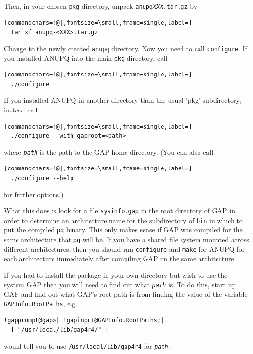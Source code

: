 \documentclass[a4paper,11pt]{report}
\begin{document}
{ Then, in your chosen \texttt{pkg} directory, unpack \texttt{anupq\texttt{}\mbox{\texttt{\mdseries\slshape XXX}}.tar.gz} by 
\begin{Verbatim}[commandchars=!@|,fontsize=\small,frame=single,label=]
  tar xf anupq-<XXX>.tar.gz
\end{Verbatim}
 Change to the newly created \texttt{anupq} directory. Now you need to call \texttt{configure}. If you installed \textsf{ANUPQ} into the main \texttt{pkg} directory, call 
\begin{Verbatim}[commandchars=!@|,fontsize=\small,frame=single,label=]
  ./configure
\end{Verbatim}
 If you installed ANUPQ in another directory than the usual 'pkg' subdirectory,
instead call 
\begin{Verbatim}[commandchars=!@|,fontsize=\small,frame=single,label=]
  ./configure --with-gaproot=<path>
\end{Verbatim}
 where \mbox{\texttt{\mdseries\slshape path}} is the path to the \textsf{GAP} home directory. (You can also call 
\begin{Verbatim}[commandchars=!@|,fontsize=\small,frame=single,label=]
  ./configure --help
\end{Verbatim}
 for further options.) 

 What this does is look for a file \texttt{sysinfo.gap} in the root directory of \textsf{GAP} in order to determine an architecture name for the subdirectory of \texttt{bin} in which to put the compiled \texttt{pq} binary. This only makes sense if \textsf{GAP} was compiled for the same architecture that \texttt{pq} will be. If you have a shared file system mounted across different
architectures, then you should run \texttt{configure} and \texttt{make} for \textsf{ANUPQ} for each architecture immediately after compiling \textsf{GAP} on the same architecture. 

 If you had to install the package in your own directory but wish to use the
system \textsf{GAP} then you will need to find out what \mbox{\texttt{\mdseries\slshape path}} is. To do this, start up \textsf{GAP} and find out what \textsf{GAP}'s root path is from finding the value of the variable \texttt{GAPInfo.RootPaths}, e.g. 
\begin{Verbatim}[commandchars=!@|,fontsize=\small,frame=single,label=Example]
  !gapprompt@gap>| !gapinput@GAPInfo.RootPaths;|
  [ "/usr/local/lib/gap4r4/" ]
\end{Verbatim}
 would tell you to use \texttt{/usr/local/lib/gap4r4} for \mbox{\texttt{\mdseries\slshape path}}. 

}
\end{document}
